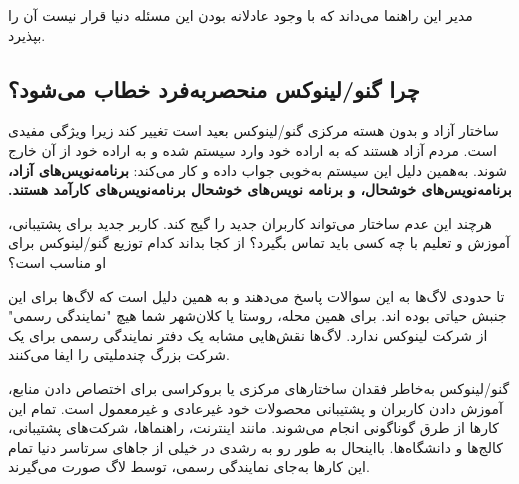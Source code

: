 \begin{note}
مدیر این راهنما می‌داند که با وجود عادلانه بودن این مسئله دنیا قرار نیست آن را بپذیرد.
\end{note}

\subsection{چرا گنو/لینوکس منحصربه‌فرد خطاب می‌شود؟}

ساختار آزاد و بدون هسته مرکزی گنو/لینوکس بعید است تغییر کند زیرا ویژگی مفیدی است.
مردم آزاد هستند که به اراده خود وارد سیستم شده و به اراده خود از آن خارج شوند.
به‌همین دلیل این سیستم ‫به‌خوبی جواب داده و کار می‌کند:
{\bfseries
برنامه‌نویس‌های آزاد، برنامه‌نویس‌های خوشحال، و برنامه نویس‌های خوشحال برنامه‌نویس‌های کارآمد هستند.
}

هرچند این عدم ساختار می‌تواند کاربران جدید را گیج کند.
کاربر جدید برای پشتیبانی، آموزش و تعلیم با چه کسی باید تماس بگیرد؟
از کجا بداند کدام توزیع گنو/لینوکس برای او مناسب است؟

تا حدودی لاگ‌ها به این سوالات پاسخ می‌دهند و به همین دلیل است که لاگ‌ها برای این جنبش حیاتی بوده اند.
برای همین محله، روستا یا کلان‌شهر شما هیچ "نمایندگی رسمی" از شرکت لینوکس ندارد.
لاگ‌ها نقش‌هایی مشابه یک دفتر نمایندگی رسمی برای یک شرکت بزرگ چندملیتی را ایفا می‌کنند.

گنو/لینوکس به‌خاطر فقدان ساختار‌های مرکزی یا بروکراسی برای اختصاص دادن منابع،
آموزش دادن کاربران و پشتیبانی محصولات خود غیرعادی و غیرمعمول است. تمام این کارها
از طرق گوناگونی انجام می‌شوند. مانند اینترنت، راهنماها،
شرکت‌های پشتیبانی، کالج‌ها و دانشگاه‌ها. بااینحال به طور رو به رشدی در خیلی از جاهای
سرتاسر دنیا تمام این کارها به‌جای نمایندگی رسمی، توسط لاگ صورت می‌گیرند.

